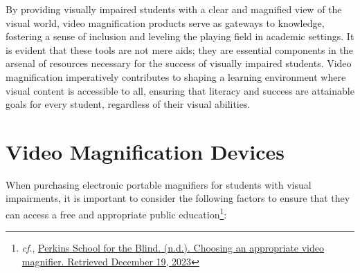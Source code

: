 By providing visually impaired students with a clear and magnified view of the visual world, video magnification products serve as gateways to knowledge, fostering a sense of inclusion and leveling the playing field in academic settings. It is evident that these tools are not mere aids; they are essential components in the arsenal of resources necessary for the success of visually impaired students. Video magnification imperatively contributes to shaping a learning environment where visual content is accessible to all, ensuring that literacy and success are attainable goals for every student, regardless of their visual abilities.

\section{Video Magnification Devices}\label{video-magnification-devices}

When purchasing electronic portable magnifiers for students with visual impairments, it is important to consider the following factors to ensure that they can access a free and appropriate public education\footnote{\emph{cf}., \href{http://www.perkins.org/resource/choosing-appropriate-video-magnifier/}{Perkins School for the Blind. (n.d.). Choosing an appropriate video magnifier. Retrieved December 19, 2023}}:

